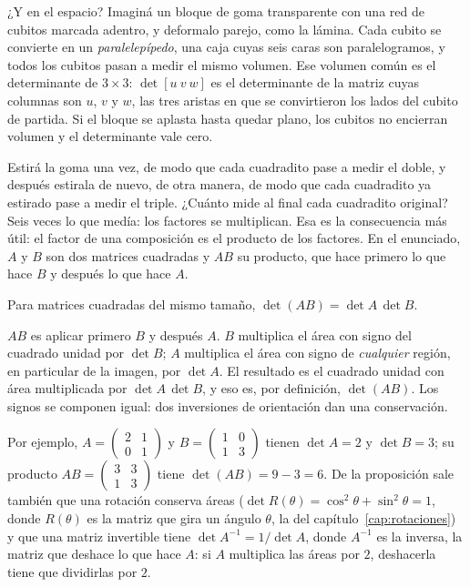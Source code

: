 ¿Y en el espacio? Imaginá un bloque de goma transparente con una red de cubitos marcada
adentro, y deformalo parejo, como la lámina. Cada cubito se convierte en un
\emph{paralelepípedo}, una caja cuyas seis caras son paralelogramos, y todos los cubitos
pasan a medir el mismo volumen. Ese volumen común es el determinante de \(3\times3\):
\(\det[u\ v\ w]\) es el determinante de la matriz cuyas columnas son \(u\), \(v\) y \(w\), las
tres aristas en que se convirtieron los lados del cubito de partida. Si el bloque se aplasta
hasta quedar plano, los cubitos no encierran volumen y el determinante vale cero.

Estirá la goma una vez, de modo que cada cuadradito pase a medir el doble, y después estirala
de nuevo, de otra manera, de modo que cada cuadradito ya estirado pase a medir el triple.
¿Cuánto mide al final cada cuadradito original?
Seis veces lo que medía: los factores se multiplican. Esa es la consecuencia más útil: el
factor de una composición es el producto de los factores. En el enunciado, \(A\) y \(B\) son
dos matrices cuadradas y \(AB\) su producto, que hace primero lo que hace \(B\) y después lo
que hace \(A\).

\begin{proposicion}\label{prop:det-producto}
Para matrices cuadradas del mismo tamaño, \(\det(AB)=\det A\,\det B\).
\end{proposicion}

\begin{demostracion}
\(AB\) es aplicar primero \(B\) y después \(A\). \(B\) multiplica el área con signo del
cuadrado unidad por \(\det B\); \(A\) multiplica el área con signo de \emph{cualquier} región,
en particular de la imagen, por \(\det A\). El resultado es el cuadrado unidad con área
multiplicada por \(\det A\,\det B\), y eso es, por definición, \(\det(AB)\). Los signos se
componen igual: dos inversiones de orientación dan una conservación.
\end{demostracion}

Por ejemplo, \(A=\left(\begin{smallmatrix}2&1\\0&1\end{smallmatrix}\right)\) y
\(B=\left(\begin{smallmatrix}1&0\\1&3\end{smallmatrix}\right)\) tienen \(\det A=2\) y
\(\det B=3\); su producto \(AB=\left(\begin{smallmatrix}3&3\\1&3\end{smallmatrix}\right)\)
tiene \(\det(AB)=9-3=6\). De la proposición sale también que una rotación conserva áreas
(\(\det R(\theta)=\cos^2\theta+\sin^2\theta=1\), donde \(R(\theta)\) es la matriz que gira un
ángulo \(\theta\), la del capítulo~\ref{cap:rotaciones}) y que una matriz invertible tiene
\(\det A^{-1}=1/\det A\), donde \(A^{-1}\) es la inversa, la matriz que deshace lo que hace
\(A\): si \(A\) multiplica las áreas por \(2\), deshacerla tiene que dividirlas por \(2\).

